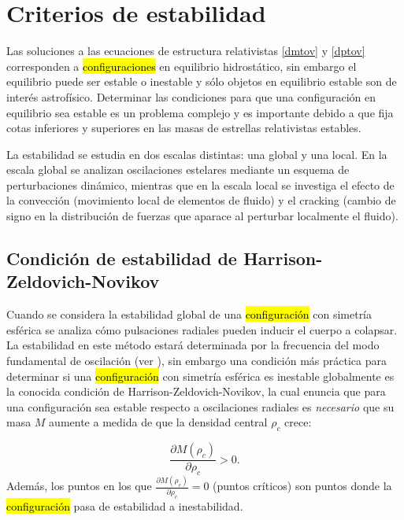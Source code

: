 \section{Criterios de estabilidad}

Las soluciones a las ecuaciones de estructura relativistas \eqref{dmtov} y \eqref{dptov} corresponden a \hl{configuraciones} en equilibrio hidrostático, sin embargo el equilibrio puede ser estable o inestable y sólo objetos en equilibrio estable son de interés astrofísico. Determinar las condiciones para que una configuración en equilibrio sea estable es un problema complejo y es importante debido a que fija cotas inferiores y superiores en las masas de estrellas relativistas estables.

La estabilidad se estudia en dos escalas distintas: una global y una local. En la escala global se analizan oscilaciones estelares mediante un esquema de perturbaciones dinámico, mientras que en la escala local se investiga el efecto de la convección (movimiento local de elementos de fluido) y el cracking (cambio de signo en la distribución de fuerzas que aparace al perturbar localmente el fluido). 


\subsection{Condición de estabilidad de Harrison-Zeldovich-Novikov}
Cuando se considera la estabilidad global de una \hl{configuraci\'on} con simetría esférica se analiza cómo pulsaciones radiales pueden inducir el cuerpo a colapsar. La estabilidad en este método estará determinada por la frecuencia del modo fundamental de oscilación (ver \cite{Haensel2007NeutronStructure,Shapiro1983}), sin embargo una condición más práctica para determinar si una \hl{configuraci\'on} con simetría esférica es inestable globalmente es la conocida condición de Harrison-Zeldovich-Novikov, la cual enuncia que para una configuración sea estable respecto a oscilaciones radiales es \emph{necesario} que su masa $M$ aumente a medida de que la densidad central $\rho_{c}$ crece: 

\begin{equation}
    \frac { \partial M \left( \rho _ { c } \right) } { \partial \rho _ { c } } > 0.
\end{equation}
Además, los puntos en los que $\frac { \partial M \left( \rho _ { c } \right) } { \partial \rho _ { c } } = 0$ (puntos críticos) son puntos donde la \hl{configuraci\'on} pasa de estabilidad a inestabilidad.


